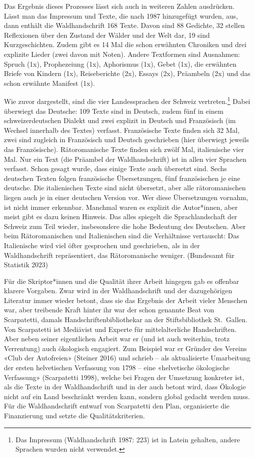 \documentclass[a4paper,
fontsize=11pt,
oneside,
numbers=noperiodatend,
parskip=half-,
bibliography=totoc,
final
]{scrartcl}
\begin{document}
Das Ergebnis dieses Prozesses lässt sich auch in weiteren Zahlen
ausdrücken. Lässt man das Impressum und Texte, die nach 1987 hinzugefügt
wurden, aus, dann enthält die Waldhandschrift 168 Texte. Davon sind 88
Gedichte, 32 stellen Reflexionen über den Zustand der Wälder und der
Welt dar, 19 sind Kurzgeschichten. Zudem gibt es 14 Mal die schon
erwähnten Chroniken und drei explizite Lieder (zwei davon mit Noten).
Andere Textformen sind Ausnahmen: Spruch (1x), Prophezeiung (1x),
Aphorismus (1x), Gebet (1x), die erwähnten Briefe von Kindern (1x),
Reiseberichte (2x), Essays (2x), Präambeln (2x) und das schon erwähnte
Manifest (1x).

Wie zuvor dargestellt, sind die vier Landessprachen der Schweiz
vertreten.\footnote{Das Impressum (Waldhandschrift 1987: 223) ist in
  Latein gehalten, andere Sprachen wurden nicht verwendet.} Dabei
überwiegt das Deutsche: 109 Texte sind in Deutsch, zudem fünf in einem
schweizerdeutschen Dialekt und zwei explizit in Deutsch und Französisch
(im Wechsel innerhalb des Textes) verfasst. Französische Texte finden
sich 32 Mal, zwei sind zugleich in Französisch und Deutsch geschrieben
(hier überwiegt jeweils das Französische). Rätoromanische Texte finden
sich zwölf Mal, italienische vier Mal. Nur ein Text (die Präambel der
Waldhandschrift) ist in allen vier Sprachen verfasst. Schon gesagt
wurde, dass einige Texte auch übersetzt sind. Sechs deutschen Texten
folgen französische Übersetzungen, fünf französischen je eine deutsche.
Die italienischen Texte sind nicht übersetzt, aber alle rätoromanischen
liegen auch je in einer deutschen Version vor. Wer diese Übersetzungen
vornahm, ist nicht immer erkennbar. Manchmal waren es explizit die
Autor*innen, aber meist gibt es dazu keinen Hinweis. Das alles spiegelt
die Sprachlandschaft der Schweiz zum Teil wieder, insbesondere die hohe
Bedeutung des Deutschen. Aber beim Rätoromanischen und Italienischen
sind die Verhältnisse vertauscht: Das Italienische wird viel öfter
gesprochen und geschrieben, als in der Waldhandschrift repräsentiert,
das Rätoromanische weniger. (Bundesamt für Statistik 2023)

Für die Skriptor*innen und die Qualität ihrer Arbeit hingegen gab es
offenbar klarere Vorgaben. Zwar wird in der Waldhandschrift und der
dazugehörigen Literatur immer wieder betont, dass sie das Ergebnis der
Arbeit vieler Menschen war, aber treibende Kraft hinter ihr war der
schon genannte Beat von Scarpatetti, damals Handschriftenbibliothekar an
der Stiftsbibliothek St.~Gallen. Von Scarpatetti ist Mediävist und
Experte für mittelalterliche Handschriften. Aber neben seiner
eigentlichen Arbeit war er (und ist auch weiterhin, trotz Verrentung)
auch ökologisch engagiert. Zum Beispiel war er Gründer des Vereins «Club
der Autofreien» (Steiner 2016) und schrieb -- als aktualisierte
Umarbeitung der ersten helvetischen Verfassung von 1798 -- eine
«helvetische ökologische Verfassung» (Scarpatetti 1998), welche bei
Fragen der Umsetzung konkreter ist, als die Texte in der Waldhandschrift
und in der auch betont wird, dass Ökologie nicht auf ein Land beschränkt
werden kann, sondern global gedacht werden muss. Für die Waldhandschrift
entwarf von Scarpatetti den Plan, organisierte die Finanzierung und setzte
die Qualitätskriterien.
\end{document}

